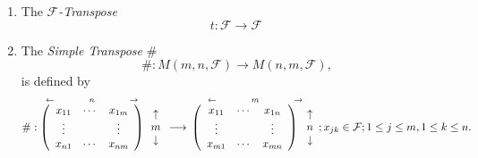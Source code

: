 \documentclass[aps, preprint]{revtex4}
\begin{document}
\begin{enumerate}
\item The $\mathcal{F}$\emph{-Transpose}
\begin{equation}t :\mathcal{F} \rightarrow \mathcal{F}
\end{equation}

\item The \emph{Simple Transpose }$\#$
\begin{equation}\# :M \left (m ,n ,\mathcal{F}\right ) \rightarrow M \left (n ,m ,\mathcal{F}\right )\text{,}
\end{equation}is defined by
\begin{equation}\# :\overset{ \leftarrow \text{\quad \quad \quad \quad }n\text{\quad \quad \quad \quad } \rightarrow }{\left (\begin{array}{ccc}x_{1 1} & \cdots  & x_{1 m} \\
\vdots  & \, & \vdots  \\
x_{n 1} & \cdots  & x_{n m}\end{array}\right )}\, \begin{array}{c}\uparrow  \\
m \\
\downarrow \end{array} \longrightarrow \,\overset{ \leftarrow \text{\quad \quad \quad \quad }m\text{\quad \quad \quad \quad } \rightarrow }{\left (\begin{array}{ccc}x_{1 1} & \cdots  & x_{1 n} \\
\vdots  & \, & \vdots  \\
x_{m 1} & \cdots  & x_{m n}\end{array}\right )\, \begin{array}{c}\uparrow  \\
n \\
\downarrow \end{array}} ;x_{j k} \in \mathcal{F} ;1 \leq j \leq m ,1 \leq k \leq n\text{.}
\end{equation}


\end{enumerate}
\end{document}
